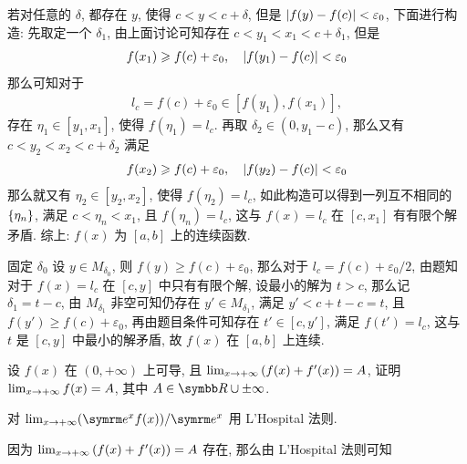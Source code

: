 \begin{exercise}[series=exer]
\begin{answer}
\begin{method}
          若对任意的 $ \delta $, 都存在 $ y $, 使得 $ c < y < c + \delta $, 但是 $ \abs{f(y) - f(c)} < \varepsilon_{0} $, 下面进行构造: 先取定一个 $ \delta_{1} $, 由上面讨论可知存在 $ c < y_{1} < x_{1} < c + \delta_{1}  $, 但是
          \begin{align*}
              f(x_{1}) \geqslant f(c) + \varepsilon_{0}, \quad \abs{f(y_{1}) - f(c)} < \varepsilon_{0}
          \end{align*}
          那么可知对于
          \begin{align*}
              l_{c} = f(c) + \varepsilon_{0} \in [f(y_{1}), f(x_{1})],
          \end{align*}
          存在 $ \eta_{1} \in [y_{1}, x_{1}] $, 使得 $ f(\eta_{1}) = l_{c} $. 再取 $ \delta_{2} \in (0, y_{1} - c) $, 那么又有 $ c < y_{2} < x_{2} < c + \delta_{2} $ 满足
          \begin{align*}
              f(x_{2}) \geqslant f(c) + \varepsilon_{0}, \quad \abs{f(y_{2}) - f(c)} < \varepsilon_{0}
          \end{align*}
          那么就又有 $ \eta_{2} \in [y_{2}, x_{2}] $, 使得 $ f(\eta_{2}) = l_{c} $, 如此构造可以得到一列互不相同的 $ \qty{\eta_{n}} $, 满足 $ c < \eta_{n} < x_{1} $, 且 $ f(\eta_{n}) = l_{c} $, 这与 $ f(x) = l_{c} $ 在 $ [c, x_{1}] $ 有有限个解矛盾. 综上: $ f(x) $ 为 $ [a, b] $ 上的连续函数.
          \item 固定 $ \delta_{0} $ 设 $ y \in M_{\delta_{0}} $, 则 $ f(y) \ge f(c) + \varepsilon_{0} $, 那么对于 $ l_{c} = f(c) + \varepsilon_{0}/2 $, 由题知对于 $ f(x) = l_{c} $ 在 $ [c, y] $ 中只有有限个解, 设最小的解为 $ t > c $, 那么记 $ \delta_{1} = t - c $, 由 $ M_{\delta_{1}} $ 非空可知仍存在 $ y' \in M_{\delta_{1}} $, 满足 $ y' < c + t - c = t $, 且 $ f(y') \ge f(c) + \varepsilon_{0} $, 再由题目条件可知存在 $ t' \in [c, y'] $, 满足 $ f(t') = l_{c} $, 这与 $ t $ 是 $ [c, y] $ 中最小的解矛盾, 故 $ f(x) $ 在 $ [a, b] $ 上连续.
      \end{method}
  \end{answer}
  \item 设 $ f(x) $ 在 $ (0, +\infty) $ 上可导, 且 $ \lim_{x \to +\infty} \qty(f(x) + f'(x)) = A $, 证明 $ \lim_{x \to +\infty} f(x) = A $, 其中 $ A \in \R\cup{\pm\infty} $.
  \begin{hint}
      对 $ \limit{x}{+\infty} (\me^{x} f(x))/\me^{x} $ 用 L'Hospital 法则.
  \end{hint}
  \begin{answer}
      因为 $ \lim_{x \to +\infty} \qty(f(x) + f'(x)) = A $ 存在, 那么由 L'Hospital 法则可知
      \begin{align*}

\end{align*}
\end{answer}
\end{exercise}
